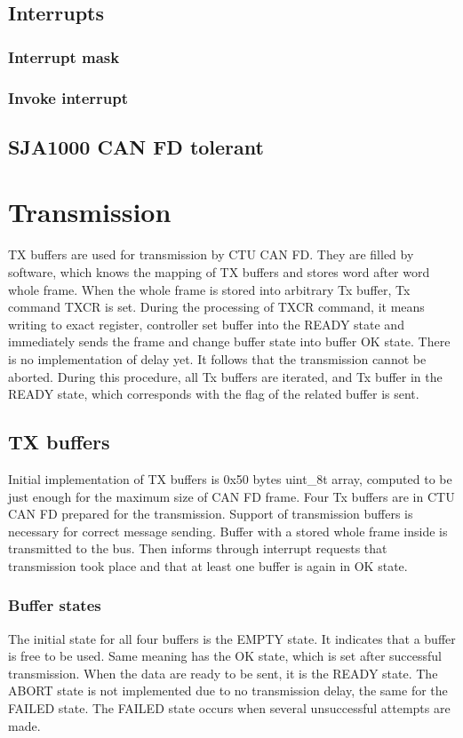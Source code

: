\documentclass{ctuthesis}
\begin{document}
 \subsection{Interrupts}
 
  \subsubsection{Interrupt mask}
  
  \subsubsection{Invoke interrupt}
 
 \subsection{SJA1000 CAN FD tolerant}

 \section{Transmission}
  TX buffers are used for transmission by CTU CAN FD. They are filled by software, which knows the mapping of TX buffers and stores word after word whole frame. When the whole frame is stored into arbitrary Tx buffer, Tx command TXCR is set. During the processing of TXCR command, it means writing to exact register, controller set buffer into the READY state and immediately sends the frame and change buffer state into buffer OK state. There is no implementation of delay yet. It follows that the transmission cannot be aborted. During this procedure, all Tx buffers are iterated, and Tx buffer in the READY state, which corresponds with the flag of the related buffer is sent.

 \subsection{TX buffers}
  Initial implementation of TX buffers is 0x50 bytes uint\_8t array, computed to be just enough for the maximum size of CAN FD frame. Four Tx buffers are in CTU CAN FD prepared for the transmission. Support of transmission buffers is necessary for correct message sending. Buffer with a stored whole frame inside is transmitted to the bus. Then informs through interrupt requests that transmission took place and that at least one buffer is again in OK state.

  \subsubsection{Buffer states}
  The initial state for all four buffers is the EMPTY state. It indicates that a buffer is free to be used. Same meaning has the OK state, which is set after successful transmission. When the data are ready to be sent, it is the READY state. The ABORT state is not implemented due to no transmission delay, the same for the FAILED state. The FAILED state occurs when several unsuccessful attempts are made.
 
\end{document}
